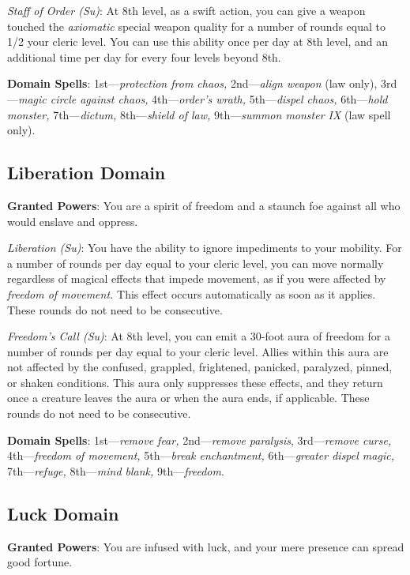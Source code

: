 \textit{Staff of Order (Su)}: At 8th level, as a swift action, you can give a weapon touched the\textit{ axiomatic }
special weapon quality for a number of rounds equal to 1/2 your cleric level. You can use this ability once per day
at 8th level, and an additional time per day for every four levels beyond 8th.
				
\textbf{Domain Spells}: 1st---\textit{protection from chaos, }2nd---\textit{align weapon }(law only), 3rd---\textit{magic circle against chaos, }4th---\textit{order's wrath, }5th---\textit{dispel chaos, }6th---\textit{hold monster, }7th---\textit{dictum, }8th---\textit{shield of law, }9th---\textit{summon monster IX} (law spell only). 
				
\subsection{Liberation Domain}


\textbf{Granted Powers}: You are a spirit of freedom and a staunch foe against all who would enslave and oppress.

\textit{Liberation (Su)}: You have the ability to ignore impediments to your mobility. For a number of rounds per
day equal to your cleric level, you can move normally regardless of magical effects that impede movement, as if
you were affected by \textit{freedom of movement.} This effect occurs automatically as soon as it applies. These
rounds do not need to be consecutive.

\textit{Freedom's Call (Su)}: At 8th level, you can emit a 30-foot aura of freedom for a number of rounds per day
equal to your cleric level. Allies within this aura are not affected by the confused, grappled, frightened,
panicked, paralyzed, pinned, or shaken conditions. This aura only suppresses these effects, and they return
once a creature leaves the aura or when the aura ends, if applicable. These rounds do not need to be consecutive. 

\textbf{Domain Spells}: 1st---\textit{remove fear, }2nd---\textit{remove paralysis}, 3rd---\textit{remove curse, }4th---\textit{freedom of movement, }5th---\textit{break enchantment, }6th---\textit{greater dispel magic, }7th---\textit{refuge, }8th---\textit{mind blank, }9th---\textit{freedom}.
				
\subsection{Luck Domain}


\textbf{Granted Powers}: You are infused with luck, and your mere presence can spread good fortune.

